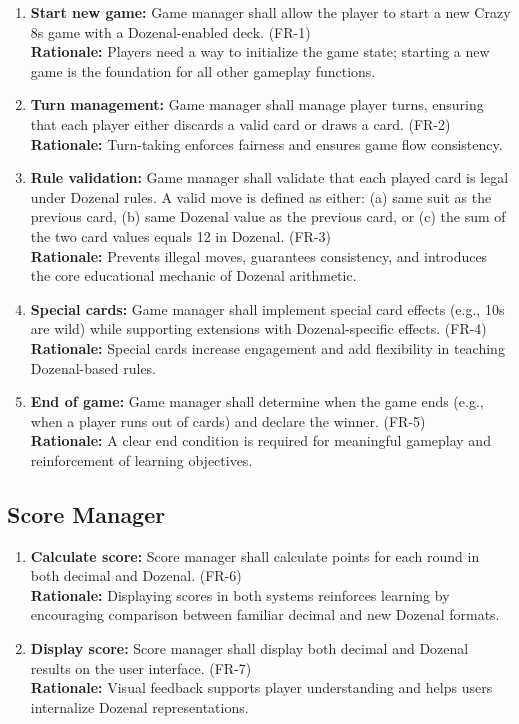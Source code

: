 \documentclass[12pt]{article}
\begin{document}
\begin{enumerate}
    \item \textbf{Start new game:} Game manager shall allow the player to start a new Crazy 8s game with a Dozenal-enabled deck. (FR-1) \\
    \textbf{Rationale:} Players need a way to initialize the game state; starting a new game is the foundation for all other gameplay functions.

    \item \textbf{Turn management:} Game manager shall manage player turns, ensuring that each player either discards a valid card or draws a card. (FR-2) \\
    \textbf{Rationale:} Turn-taking enforces fairness and ensures game flow consistency.

    \item \textbf{Rule validation:} Game manager shall validate that each played card is legal under Dozenal rules. A valid move is defined as either: (a) same suit as the previous card, (b) same Dozenal value as the previous card, or (c) the sum of the two card values equals 12 in Dozenal. (FR-3) \\
    \textbf{Rationale:} Prevents illegal moves, guarantees consistency, and introduces the core educational mechanic of Dozenal arithmetic.

    \item \textbf{Special cards:} Game manager shall implement special card effects (e.g., 10s are wild) while supporting extensions with Dozenal-specific effects. (FR-4) \\
    \textbf{Rationale:} Special cards increase engagement and add flexibility in teaching Dozenal-based rules.

    \item \textbf{End of game:} Game manager shall determine when the game ends (e.g., when a player runs out of cards) and declare the winner. (FR-5) \\
    \textbf{Rationale:} A clear end condition is required for meaningful gameplay and reinforcement of learning objectives.
\end{enumerate}


\subsection{Score Manager}

\begin{enumerate}
    \item \textbf{Calculate score:} Score manager shall calculate points for each round in both decimal and Dozenal. (FR-6) \\
    \textbf{Rationale:} Displaying scores in both systems reinforces learning by encouraging comparison between familiar decimal and new Dozenal formats.

    \item \textbf{Display score:} Score manager shall display both decimal and Dozenal results on the user interface. (FR-7) \\
    \textbf{Rationale:} Visual feedback supports player understanding and helps users internalize Dozenal representations.
\end{enumerate}
\end{document}

